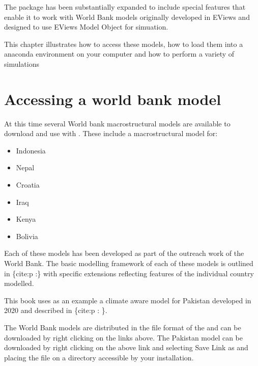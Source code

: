 \documentclass[letterpaper,10pt,english]{jupyterBook}
\begin{document}
\sphinxAtStartPar
The package has been substantially expanded to include special features that enable it to work with World Bank models originally developed in EViews and designed to use EViews Model Object for simuation.

\sphinxAtStartPar
This chapter illustrates how to access these models, how to load them into a  anaconda environment on your computer and how to perform a variety of simulations


\chapter{Accessing a world bank model}
\label{\detokenize{content/06_WBModels/LoadingWBModel:accessing-a-world-bank-model}}
\sphinxAtStartPar
At this time several World bank macrostructural models are available to download and use with .  These include a macrostructural model for:
\begin{itemize}
\item {} 
\sphinxAtStartPar
Indonesia

\item {} 
\sphinxAtStartPar
Nepal

\item {} 
\sphinxAtStartPar
Croatia

\item {} 
\sphinxAtStartPar
Iraq

\item {} 
\sphinxAtStartPar
Kenya

\item {} 
\sphinxAtStartPar
Bolivia

\end{itemize}

\sphinxAtStartPar
Each of these models has been developed as part of the outreach work of the World Bank.  The basic modelling framework of each of these models is outlined in \{cite:p :\} with specific extensions reflecting features of the individual country modelled.

\sphinxAtStartPar
This book uses as an example a climate aware model for Pakistan developed in 2020 and described in \{cite:p : \}.

\sphinxAtStartPar
The World Bank models are distributed in the  file format of the  and can be downloaded by right clicking on the links above.  The Pakistan model can be downloaded  by right clicking on the above link and selecting Save Link as and placing the file on a directory accessible by your  installation.
\end{document}
